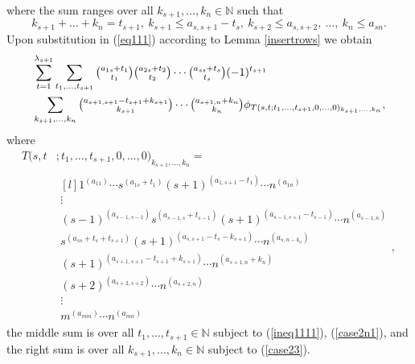 	where the sum ranges over all
	$k_{s+1},\dots,k_n \in \mathbb{N}$ such that \begin{equation}\label{case23}k_{s+1}+\dots+k_n=t_{s+1}, \  k_{s+1} \le a_{s,s+1}-t_s, \  k_{s+2} \le a_{s,s+2}, \  \dots, \  k_n \le a_{sn}.\end{equation}
	Upon substitution in (\ref{eq111}) according to Lemma \ref{insertrows} we obtain
	\begin{align*}
		&\sum_{t=1}^{\lambda_{s+1}}\sum_{t_1,\dots,t_{s+1}}\tbinom{a_{1s}+t_1}{t_1}\tbinom{a_{2s}+t_2}{t_2} \cdots \tbinom{a_{ss}+t_s}{t_s}(-1)^{t_{s+1}}\\& \sum_{k_{s+1},\dots,k_n}\tbinom{a_{s+1,s+1}-t_{s+1}+k_{s+1}}{k_{s+1}}\cdots\tbinom{a_{s+1,n}+k_n}{k_n}\phi_{T(s,t;t_1,\dots,t_{s+1},0,\dots,0)_{k_{s+1},\dots,k_n}},
	\end{align*} 
	where  \begin{align}\label{eq1110}T(s,t&;t_1,\dots,t_{s+1},0,\dots,0)_{k_{s+1},\dots,k_n}= \\\nonumber&\begin{matrix*}[l]
			1^{(a_{11})} \cdots s^{(a_{1s}+t_{1})}(s+1)^{(a_{1,s+1}-t_1)} \cdots n^{(a_{1n})} \\
			\vdots \\ 
			(s-1)^{(a_{s-1,s-1})}s^{(a_{s-1,s}+t_{s-1})}(s+1)^{(a_{s-1,s+1}-t_{s-1})} \cdots n^{(a_{s-1,n})} \\
			s^{(a_{ss}+t_s+t_{s+1})}(s+1)^{(a_{s,s+1}-t_s-k_{s+1})} \cdots n^{(a_{s,n-k_n})} \\
		(s+1)^{(a_{s+1,s+1}-t_{s+1}+k_{s+1})} \cdots n^{(a_{s+1,n}+k_n)}\\
			(s+2)^{(a_{s+2,s+2})}\cdots n^{(a_{s+2,n})} \\
			\vdots\\
			m^{(a_{mm})} \cdots n^{(a_{mn})}  \end{matrix*},\end{align} the middle sum is over all  $t_1,\dots,t_{s+1} \in \mathbb{N}$ subject to (\ref{ineq1111}), (\ref{case2n1}), and the right sum is over all  $k_{s+1},\dots,k_{n} \in \mathbb{N}$ subject to (\ref{case23}). 
	
